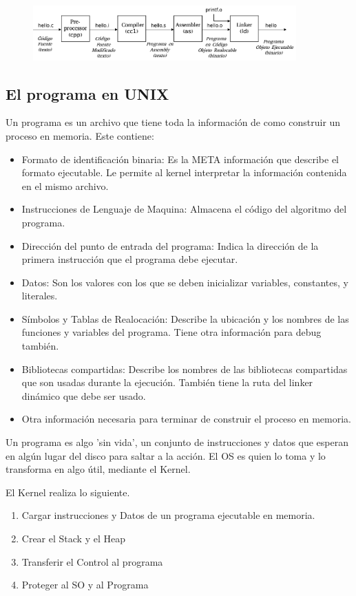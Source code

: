 \documentclass[titlepage,a4paper]{article}
\begin{document}
\begin{figure}[!htb]
    \centering
    \includegraphics[width=0.9\textwidth]{ImagenesApunte/compilation.jpg}
\end{figure}

\subsection*{El programa en UNIX}
Un programa es un archivo que tiene toda la información de como construir un proceso en memoria. Este contiene:
\begin{itemize}
    \item Formato de identificación binaria: Es la META información que describe el formato ejecutable. Le permite al kernel interpretar la información contenida en el mismo archivo.
    \item Instrucciones de Lenguaje de Maquina: Almacena el código del algoritmo del programa.
    \item Dirección del punto de entrada del programa: Indica la dirección de la primera instrucción que el programa debe ejecutar.
    \item Datos: Son los valores con los que se deben inicializar variables, constantes, y literales.
    \item Símbolos y Tablas de Realocación: Describe la ubicación y los nombres de las funciones y variables del programa. Tiene otra información para debug también.
    \item Bibliotecas compartidas: Describe los nombres de las bibliotecas compartidas que son usadas durante la ejecución. También tiene la ruta del linker dinámico que debe ser usado.
    \item Otra información necesaria para terminar de construir el proceso en memoria.
\end{itemize}

Un programa es algo 'sin vida', un conjunto de instrucciones y datos que esperan en algún lugar del disco para saltar a la acción. El OS es quien lo toma y lo transforma en algo útil, mediante el Kernel.

El Kernel realiza lo siguiente.
\begin{enumerate}
    \item Cargar instrucciones y Datos de un programa ejecutable en memoria.
    \item Crear el Stack y el Heap
    \item Transferir el Control al programa
    \item Proteger al SO y al Programa
\end{enumerate}
\end{document}

